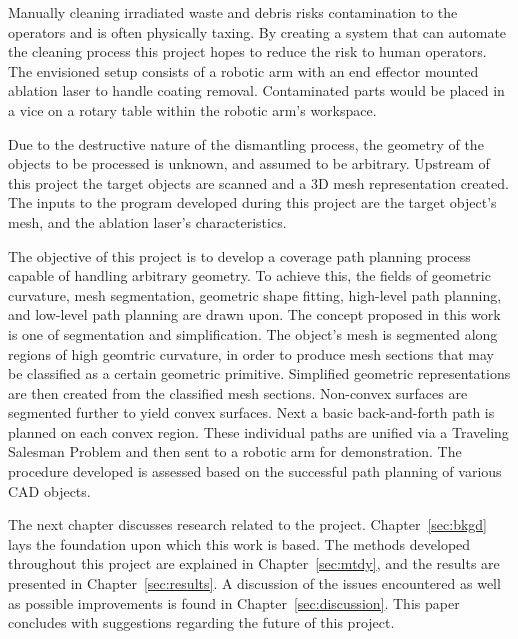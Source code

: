 Manually cleaning irradiated waste and debris risks contamination to the operators and is often physically taxing.
By creating a system that can automate the cleaning process this project hopes to reduce the risk to human operators.
The envisioned setup consists of a robotic arm with an end effector mounted ablation laser to handle coating removal.
Contaminated parts would be placed in a vice on a rotary table within the robotic arm's workspace.

Due to the destructive nature of the dismantling process, the geometry of the objects to be processed is unknown, and assumed to be arbitrary.
Upstream of this project the target objects are scanned and a 3D mesh representation created.
The inputs to the program developed during this project are the target object's mesh, and the ablation laser's characteristics.

The objective of this project is to develop a coverage path planning process capable of handling arbitrary geometry.
To achieve this, the fields of geometric curvature, mesh segmentation, geometric shape fitting, high-level path planning, and low-level path planning are drawn upon.
The concept proposed in this work is one of segmentation and simplification.
The object's mesh is segmented along regions of high geomtric curvature, in order to produce mesh sections that may be classified as a certain geometric primitive.
Simplified geometric representations are then created from the classified mesh sections.
Non-convex surfaces are segmented further to yield convex surfaces.
Next a basic back-and-forth path is planned on each convex region.
These individual paths are unified via a Traveling Salesman Problem and then sent to a robotic arm for demonstration.
The procedure developed is assessed based on the successful path planning of various CAD objects.


The next chapter discusses research related to the project.
Chapter~\ref{sec:bkgd} lays the foundation upon which this work is based.
The methods developed throughout this project are explained in Chapter~\ref{sec:mtdy}, and the results are presented in Chapter~\ref{sec:results}.
A discussion of the issues encountered as well as possible improvements is found in Chapter~\ref{sec:discussion}.
This paper concludes with suggestions regarding the future of this project.

